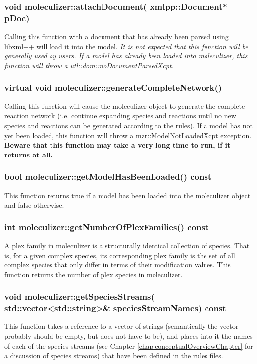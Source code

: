 \subsubsection{void moleculizer::attachDocument( xmlpp::Document*
  pDoc)}
Calling this function with a document that has already been parsed
using libxml++ will load it into the model.  \em{It is not expected
  that this function will be generally used by users}.  If a model has
already been loaded into moleculizer, this function will throw a
utl::dom::noDocumentParsedXcpt. 

\subsubsection{virtual void moleculizer::generateCompleteNetwork()}
Calling this function will cause the moleculizer object to generate
the complete reaction network (i.e. continue expanding species and
reactions until no new species and reactions can be generated
according to the rules).  If a model has not yet been loaded, this
function will throw a mzr::ModelNotLoadedXcpt exception.
\textbf{Beware that this function may take a very long time to run, if
  it returns at all.}  

\subsubsection{bool moleculizer::getModelHasBeenLoaded() const}
This function returns true if a model has been loaded into the
moleculizer object and false otherwise.  

\subsubsection{int moleculizer::getNumberOfPlexFamilies() const}
A plex family in moleculizer is a structurally identical collection of
species.  That is, for a given complex species, its corresponding plex
family is the set of all complex species that only differ in terms of
their modification values.  This function returns the number of plex
species in moleculizer.  

\subsubsection{void moleculizer::getSpeciesStreams(
  std::vector<std::string>\& speciesStreamNames) const}
This function takes a reference to a vector of strings (semantically
the vector probably should be empty, but does not have to be), and
places into it the names of each of the species streams (see Chapter
\ref{chap:conceptualOverviewChapter} for a discussion of species
streams) that have been defined in the rules files.  

